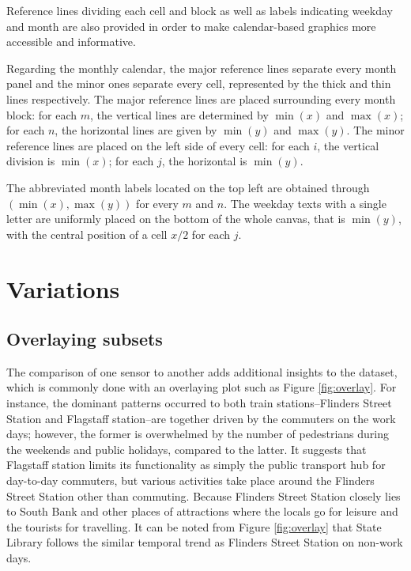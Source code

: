 \documentclass[article]{jss}
\begin{document}
Reference lines dividing each cell and block as well as labels
indicating weekday and month are also provided in order to make
calendar-based graphics more accessible and informative.

Regarding the monthly calendar, the major reference lines separate every
month panel and the minor ones separate every cell, represented by the
thick and thin lines respectively. The major reference lines are placed
surrounding every month block: for each \(m\), the vertical lines are
determined by \(\min{(x)}\) and \(\max{(x)}\); for each \(n\), the
horizontal lines are given by \(\min{(y)}\) and \(\max{(y)}\). The minor
reference lines are placed on the left side of every cell: for each
\(i\), the vertical division is \(\min{(x)}\); for each \(j\), the
horizontal is \(\min{(y)}\).

The abbreviated month labels located on the top left are obtained
through \((\min{(x)}, \max{(y)})\) for every \(m\) and \(n\). The
weekday texts with a single letter are uniformly placed on the bottom of
the whole canvas, that is \(\min{(y)}\), with the central position of a
cell \(x / 2\) for each \(j\).

\section{Variations}\label{variations}

\label{sec:examples}

\subsection{Overlaying subsets}\label{overlaying-subsets}

The comparison of one sensor to another adds additional insights to the
dataset, which is commonly done with an overlaying plot such as Figure
\ref{fig:overlay}. For instance, the dominant patterns occurred to both
train stations--Flinders Street Station and Flagstaff station--are
together driven by the commuters on the work days; however, the former
is overwhelmed by the number of pedestrians during the weekends and
public holidays, compared to the latter. It suggests that Flagstaff
station limits its functionality as simply the public transport hub for
day-to-day commuters, but various activities take place around the
Flinders Street Station other than commuting. Because Flinders Street
Station closely lies to South Bank and other places of attractions where
the locals go for leisure and the tourists for travelling. It can be
noted from Figure \ref{fig:overlay} that State Library follows the
similar temporal trend as Flinders Street Station on non-work days.
\end{document}
